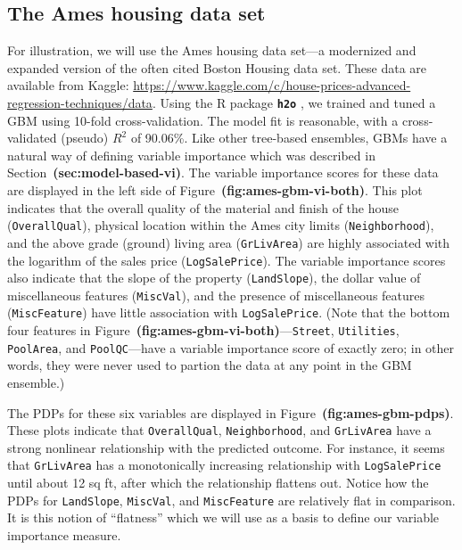 \documentclass[12pt]{article}
\newcommand{\pkg}[1]{\texorpdfstring%
{{\normalfont\fontseries{b}\selectfont #1}}%
{#1}}
\def\code#1{\texttt{#1}}
\def\pkg#1{\textbf{\texttt{#1}}}
\def\ref#1{\textbf{(#1)}}
\begin{document}
\subsection{The Ames housing data set}
\label{sec:ames}

For illustration, we will use the Ames housing data set---a modernized and expanded version of the often cited Boston Housing data set. These data are available from Kaggle: \url{https://www.kaggle.com/c/house-prices-advanced-regression-techniques/data}. Using the R package \pkg{h2o} \citep{h2o-pkg}, we trained and tuned a GBM using 10-fold cross-validation. The model fit is reasonable, with a cross-validated (pseudo) $R^2$ of 90.06\%. Like other tree-based ensembles, GBMs have a natural way of defining variable importance which was described in Section~\ref{sec:model-based-vi}. The variable importance scores for these data are displayed in the left side of Figure~\ref{fig:ames-gbm-vi-both}. This plot indicates that the overall quality of the material and finish of the house (\code{OverallQual}), physical location within the Ames city limits (\code{Neighborhood}), and the above grade (ground) living area (\code{GrLivArea}) are highly associated with the logarithm of the sales price (\code{LogSalePrice}). The variable importance scores also indicate that the slope of the property (\code{LandSlope}), the dollar value of miscellaneous features (\code{MiscVal}), and the presence of miscellaneous features (\code{MiscFeature}) have little association with \code{LogSalePrice}. (Note that the bottom four features in Figure~\ref{fig:ames-gbm-vi-both}---\code{Street}, \code{Utilities}, \code{PoolArea}, and \code{PoolQC}---have a variable importance score of exactly zero; in other words, they were never used to partion the data at any point in the GBM ensemble.)


The PDPs for these six variables are displayed in Figure~\ref{fig:ames-gbm-pdps}. These plots indicate that \code{OverallQual}, \code{Neighborhood}, and \code{GrLivArea} have a strong nonlinear relationship with the predicted outcome. For instance, it seems that \code{GrLivArea} has a monotonically increasing relationship with \code{LogSalePrice} until about 12 sq ft, after which the relationship flattens out. Notice how the PDPs for \code{LandSlope}, \code{MiscVal}, and \code{MiscFeature} are relatively flat in comparison. It is this notion of ``flatness'' which we will use as a basis to define our variable importance measure.
\end{document}

